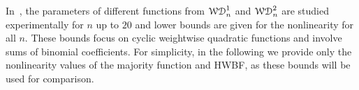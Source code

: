 \documentclass[11pt]{llncs}
\begin{document}
In~\cite{DAM:MeaOza24}, the parameters of different functions from $\mathcal{WD}^{1}_{n}$ and $\mathcal{WD}^{2}_{n}$ are studied experimentally for $n$ up to $20$ and lower bounds are given for the nonlinearity for all $n$. 
These bounds focus on cyclic weightwise quadratic functions and involve sums of binomial coefficients. For simplicity, in the following we provide only the nonlinearity values of the majority function and HWBF, as these bounds will be used for comparison.

\end{document}
